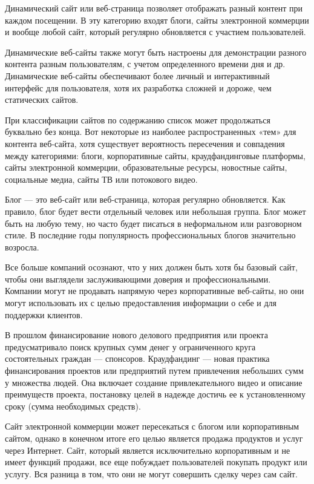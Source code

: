 Динамический сайт или веб-страница позволяет отображать разный контент при каждом посещении.
В эту категорию входят блоги, сайты электронной коммерции и вообще любой сайт, который регулярно обновляется с участием пользователей.

Динамические веб-сайты также могут быть настроены для демонстрации разного контента разным пользователям, с учетом определенного времени дня и др.
Динамические веб-сайты обеспечивают более личный и интерактивный интерфейс для пользователя, хотя их разработка сложней и дороже, чем статических сайтов.


При классификации сайтов по содержанию список может продолжаться буквально без конца.
Вот некоторые из наиболее распространенных «тем» для контента веб-сайта, хотя существует вероятность пересечения и совпадения между категориями: блоги, корпоративные сайты, краудфандинговые платформы, сайты электронной коммерции, образовательные ресурсы, новостные сайты, социальные медиа, сайты ТВ или потокового видео.

Блог — это веб-сайт или веб-страница, которая регулярно обновляется.
Как правило, блог будет вести отдельный человек или небольшая группа.
Блог может быть на любую тему, но часто будет писаться в неформальном или разговорном стиле.
В последние годы популярность профессиональных блогов значительно возросла.

Все больше компаний осознают, что у них должен быть хотя бы базовый сайт, чтобы они выглядели заслуживающими доверия и профессиональными.
Компании могут не продавать напрямую через корпоративные веб-сайты, но они могут использовать их с целью предоставления информации о себе и для поддержки клиентов.

В прошлом финансирование нового делового предприятия или проекта предусматривало поиск крупных сумм денег у ограниченного круга состоятельных граждан — спонсоров.
Краудфандинг — новая практика финансирования проектов или предприятий путем привлечения небольших сумм у множества людей.
Она включает создание привлекательного видео и описание преимуществ проекта, постановку целей в надежде достичь ее к установленному сроку (сумма необходимых средств).

Сайт электронной коммерции может пересекаться с блогом или корпоративным сайтом, однако в конечном итоге его целью является продажа продуктов и услуг через Интернет.
Сайт, который является исключительно корпоративным и не имеет функций продажи, все еще побуждает пользователей покупать продукт или услугу.
Вся разница в том, что они не могут совершить сделку через сам сайт.

